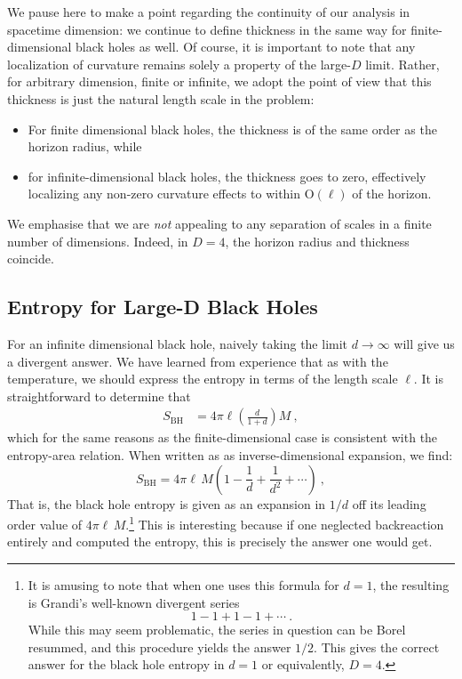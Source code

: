\documentclass[a4paper,11pt]{article}
\begin{document}
We pause here to make a point regarding the continuity of our analysis in spacetime dimension: we continue to define thickness in the same way for finite-dimensional black holes as well. Of course, it is important to note that any localization of curvature remains solely a property of the large-$D$ limit. Rather, for arbitrary dimension, finite or infinite, we adopt the point of view that this thickness is just the natural length scale in the problem:
\begin{itemize}
    \item For finite dimensional black holes, the thickness is of the same order as the horizon radius, while
    \item for infinite-dimensional black holes, the thickness goes to zero, effectively localizing any non-zero curvature effects to within O$(\ell)$ of the horizon.
\end{itemize}
We emphasise that we are \emph{not} appealing to any separation of scales in a finite number of dimensions. Indeed, in $D = 4$, the horizon radius and thickness coincide. 

\subsection{Entropy for Large-D Black Holes}
For an infinite dimensional black hole, naively taking the limit $d \rightarrow \infty$ will give us a divergent answer. We have learned from experience that as with the temperature, we should express the entropy in terms of the length scale $\ell$. It is straightforward to determine that
\begin{align}
S_{\text{BH}} &= 4\pi\ell \left(\frac{d}{1+d} \right) M \ ,
\end{align}
which for the same reasons as the finite-dimensional case is consistent with the entropy-area relation. When written as as inverse-dimensional expansion, we find:
\begin{equation}
S_{\text{BH}} = 4\pi \ell \, M \left( 1 - \frac{1}{d} + \frac{1}{d^2} + \cdots \right) \ ,
\end{equation}
That is, the black hole entropy is given as an expansion in $1/d$ off its leading order value of $4\pi\ell\,M$.\footnote{It is amusing to note that when one uses this formula for $d = 1$, the resulting is Grandi's well-known divergent series
\begin{equation*}
1-1+1-1+ \cdots \ .
\end{equation*}
While this may seem problematic, the series in question can be Borel resummed, and this procedure yields the answer $1/2$. This gives the correct answer for the black hole entropy in $d = 1$ or equivalently, $D = 4$.} This is interesting because if one neglected backreaction entirely and computed the entropy, this is precisely the answer one would get.
\end{document}
